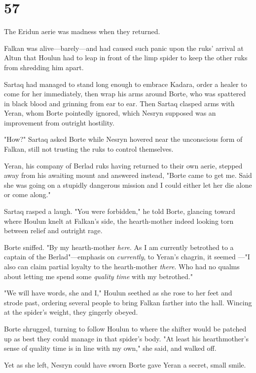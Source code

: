 
\chapter{57}

The Eridun aerie was madness when they returned.

Falkan was alive---barely---and had caused such panic upon the ruks' arrival at Altun that Houlun had to leap in front of the limp spider to keep the other ruks from shredding him apart.

Sartaq had managed to stand long enough to embrace Kadara, order a healer to come for her immediately, then wrap his arms around Borte, who was spattered in black blood and grinning from ear to ear.
Then Sartaq clasped arms with Yeran, whom Borte pointedly ignored, which Nesryn supposed was an improvement from outright hostility.

"How?"
Sartaq asked Borte while Nesryn hovered near the unconscious form of Falkan, still not trusting the ruks to control themselves.

Yeran, his company of Berlad ruks having returned to their own aerie, stepped away from his awaiting mount and answered instead, "Borte came to get me.
Said she was going on a stupidly dangerous mission and I could either let her die alone or come along."

Sartaq rasped a laugh.
"You were forbidden," he told Borte, glancing toward where Houlun knelt at Falkan's side, the hearth-mother indeed looking torn between relief and outright rage.

Borte sniffed.
"By my hearth-mother \emph{here}.
As I am currently betrothed to a captain of the Berlad"---emphasis on \emph{currently}, to Yeran's chagrin, it seemed ---"I also can claim partial loyalty to the hearth-mother \emph{there}.
Who had no qualms about letting me spend some \emph{quality time} with my betrothed."

"We will have words, she and I," Houlun seethed as she rose to her feet and strode past, ordering several people to bring Falkan farther into the hall.
Wincing at the spider's weight, they gingerly obeyed.

Borte shrugged, turning to follow Houlun to where the shifter would be patched up as best they could manage in that spider's body.
"At least his hearthmother's sense of quality time is in line with my own," she said, and walked off.

Yet as she left, Nesryn could have sworn Borte gave Yeran a secret, small smile.

